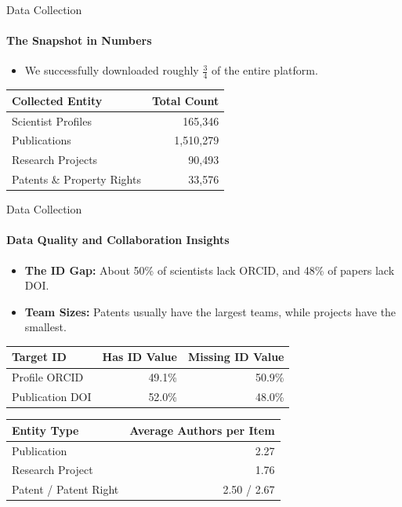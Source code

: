 \documentclass{beamer}
\begin{document}
\begin{frame}{Data Collection}
    \framesubtitle{The Snapshot in Numbers}
    \begin{itemize}
        \item We successfully downloaded roughly $\frac{3}{4}$ of the entire platform.
    \end{itemize}
    \begin{table}
        \centering
        \small
        \begin{tabular}{lr}
            \hline
            \textbf{Collected Entity} & \textbf{Total Count} \\
            \hline
            Scientist Profiles & 165,346 \\
            Publications & 1,510,279 \\
            Research Projects & 90,493 \\
            Patents \& Property Rights & 33,576 \\
            \hline
        \end{tabular}
    \end{table}
\end{frame}

\begin{frame}{Data Collection}
    \framesubtitle{Data Quality and Collaboration Insights}
    \begin{itemize}
        \item \textbf{The ID Gap:} About 50\% of scientists lack ORCID, and 48\% of papers lack DOI.
        \item \textbf{Team Sizes:} Patents usually have the largest teams, while projects have the smallest.
    \end{itemize}
    
    \begin{table}
        \centering
        \footnotesize
        \begin{tabular}{lrr}
            \hline
            \textbf{Target ID} & \textbf{Has ID Value} & \textbf{Missing ID Value} \\
            \hline
            Profile ORCID & 49.1\% & 50.9\% \\
            Publication DOI & 52.0\% & 48.0\% \\
            \hline
        \end{tabular}
    \end{table}

    \begin{table}
        \centering
        \footnotesize
        \begin{tabular}{lr}
            \hline
            \textbf{Entity Type} & \textbf{Average Authors per Item} \\
            \hline
            Publication & 2.27 \\
            Research Project & 1.76 \\
            Patent / Patent Right & 2.50 / 2.67 \\
            \hline
        \end{tabular}
    \end{table}
\end{frame}
\end{document}
